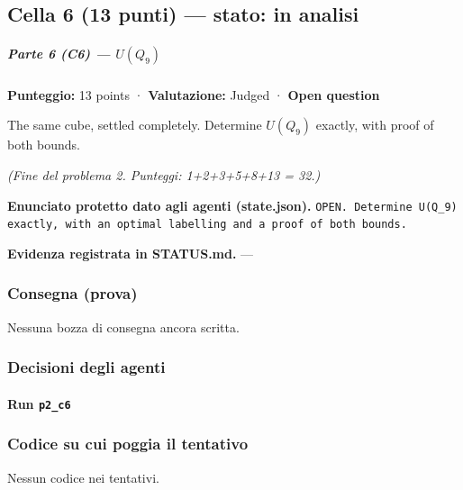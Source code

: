 \documentclass[11pt,a4paper]{article}
\begin{document}
\subsection{Cella 6 (13 punti) — stato: in analisi}
\subparagraph{\texorpdfstring{Parte 6 (C6) ---
\(U(Q_9)\)}{Parte 6 (C6) --- U(Q\_9)}}\label{parte-6-c6-uq_9}

\textbf{Punteggio:} 13 points · \textbf{Valutazione:} Judged ·
\textbf{Open question}

The same cube, settled completely. Determine \(U(Q_9)\) exactly, with
proof of both bounds.

\emph{(Fine del problema 2. Punteggi: 1+2+3+5+8+13 = 32.)}

\textbf{Enunciato protetto dato agli agenti (state.json).} \texttt{OPEN. Determine U(Q\_9) exactly, with an optimal labelling and a proof of both bounds.}

\textbf{Evidenza registrata in STATUS.md.} —

\subsubsection{Consegna (prova)}
Nessuna bozza di consegna ancora scritta.

\subsubsection{Decisioni degli agenti}
\paragraph{Run \texttt{p2\_c6}}

\subsubsection{Codice su cui poggia il tentativo}
Nessun codice nei tentativi.
\end{document}
